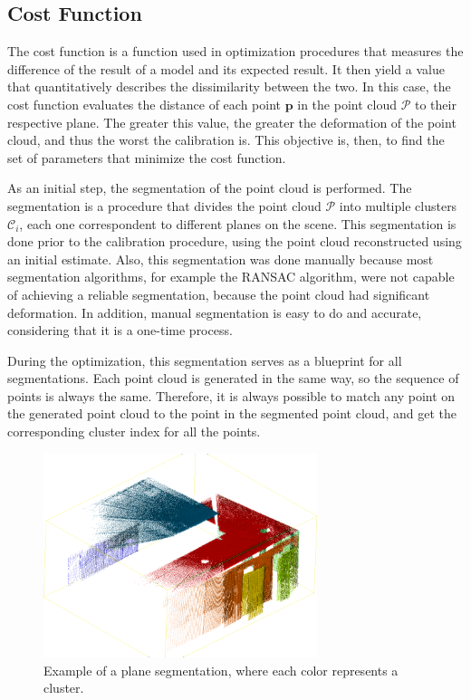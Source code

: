 \documentclass[conference]{IEEEtran}
\begin{document}
\subsection{Cost Function}

The cost function is a function used in optimization procedures that measures the difference of the result of a model and its expected result. It then yield a value that quantitatively describes the dissimilarity between the two. In this case, the cost function evaluates the distance of each point $\mathbf{p}$ in the point cloud $\mathcal{P}$ to their respective plane. The greater this value, the greater the deformation of the point cloud, and thus the worst the calibration is. This objective is, then, to find the set of parameters that minimize the cost function.

As an initial step, the segmentation of the point cloud is performed. The segmentation is a procedure that divides the point cloud $\mathcal{P}$ into multiple clusters $\mathcal{C}_i$, each one correspondent to different planes on the scene. This segmentation is done prior to the calibration procedure, using the point cloud reconstructed using an initial estimate. Also, this segmentation was done manually because most segmentation algorithms, for example the RANSAC algorithm, were not capable of achieving a reliable segmentation, because the point cloud had significant deformation. In addition, manual segmentation is easy to do and accurate, considering that it is a one-time process. 

During the optimization, this segmentation serves as a blueprint for all segmentations. Each point cloud is generated in the same way, so the sequence of points is always the same. Therefore, it is always possible to match any point on the generated point cloud to the point in the segmented point cloud, and get the corresponding cluster index for all the points. 

\begin{figure}[h]
    \centering
    \includegraphics[width=8cm]{images/segmented-pointcloud}
    \caption{Example of a plane segmentation, where each color represents a cluster.}
    \label{figure:cluster-segmentation-1}
\end{figure}
\end{document}
